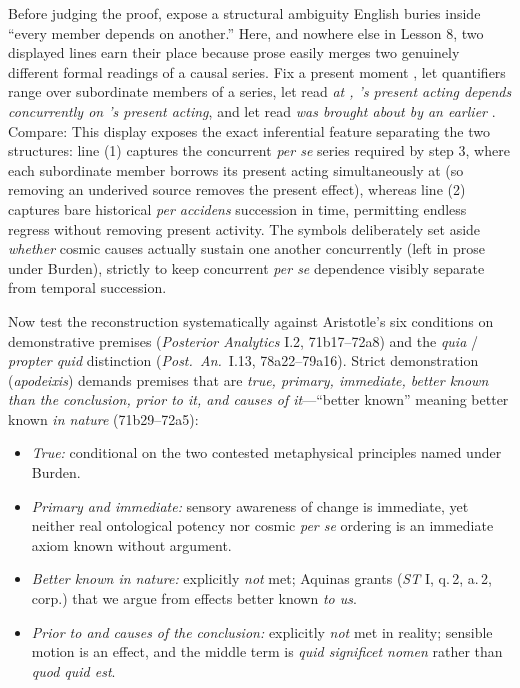 Before judging the proof, expose a structural ambiguity English buries inside ``every member depends on another.'' Here, and nowhere else in Lesson 8, two displayed lines earn their place because prose easily merges two genuinely different formal readings of a causal series. Fix a present moment , let quantifiers range over subordinate members of a series, let  read \emph{at , 's present acting depends concurrently on 's present acting}, and let  read \emph{ was brought about by an earlier }. Compare:
This display exposes the exact inferential feature separating the two structures: line (1) captures the concurrent \emph{per se} series required by step 3, where each subordinate member borrows its present acting simultaneously at  (so removing an underived source removes the present effect), whereas line (2) captures bare historical \emph{per accidens} succession in time, permitting endless regress without removing present activity. The symbols deliberately set aside \emph{whether} cosmic causes actually sustain one another concurrently (left in prose under Burden), strictly to keep concurrent \emph{per se} dependence visibly separate from temporal succession.

Now test the reconstruction systematically against Aristotle's six conditions on demonstrative premises (\emph{Posterior Analytics} I.2, 71b17--72a8) and the \emph{quia} / \emph{propter quid} distinction (\emph{Post.\ An.}\ I.13, 78a22--79a16). Strict demonstration (\emph{apodeixis}) demands premises that are \emph{true, primary, immediate, better known than the conclusion, prior to it, and causes of it}---``better known'' meaning better known \emph{in nature} (71b29--72a5):

\begin{itemize}
\item \emph{True:} conditional on the two contested metaphysical principles named under Burden.
\item \emph{Primary and immediate:} sensory awareness of change is immediate, yet neither real ontological potency nor cosmic \emph{per se} ordering is an immediate axiom known without argument.
\item \emph{Better known in nature:} explicitly \emph{not} met; Aquinas grants (\emph{ST} I, q.\,2, a.\,2, corp.) that we argue from effects better known \emph{to us}.
\item \emph{Prior to and causes of the conclusion:} explicitly \emph{not} met in reality; sensible motion is an effect, and the middle term is \emph{quid significet nomen} rather than \emph{quod quid est}.
\end{itemize}

